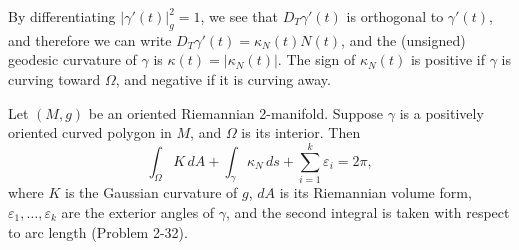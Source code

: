 By differentiating $|\gamma'(t)|_g^2 = 1$, we see that $D_T\gamma'(t)$ is orthogonal to $\gamma'(t)$, and therefore
we can write $D_T\gamma'(t) = \kappa_N(t) N(t)$, and the (unsigned) geodesic curvature of
$\gamma$ is $\kappa(t) = |\kappa_N(t)|$. The sign of $\kappa_N(t)$ is positive if $\gamma$ is curving toward $\Omega$, and
negative if it is curving away.

\begin{theorem}
\label{thm:gauss-bonnet-formula}
Let $(M, g)$ be an oriented Riemannian 2-manifold. Suppose $\gamma$ is a positively oriented curved polygon in $M$, and $\Omega$ is its interior. Then
\begin{equation}
\int_\Omega K \, dA + \int_\gamma \kappa_N \, ds + \sum_{i=1}^k \varepsilon_i = 2\pi,
\tag{9.6}
\end{equation}
where $K$ is the Gaussian curvature of $g$, $dA$ is its Riemannian volume form,
$\varepsilon_1, \ldots, \varepsilon_k$ are the exterior angles of $\gamma$, and the second integral is taken with respect
to arc length (Problem 2-32).
\end{theorem}

